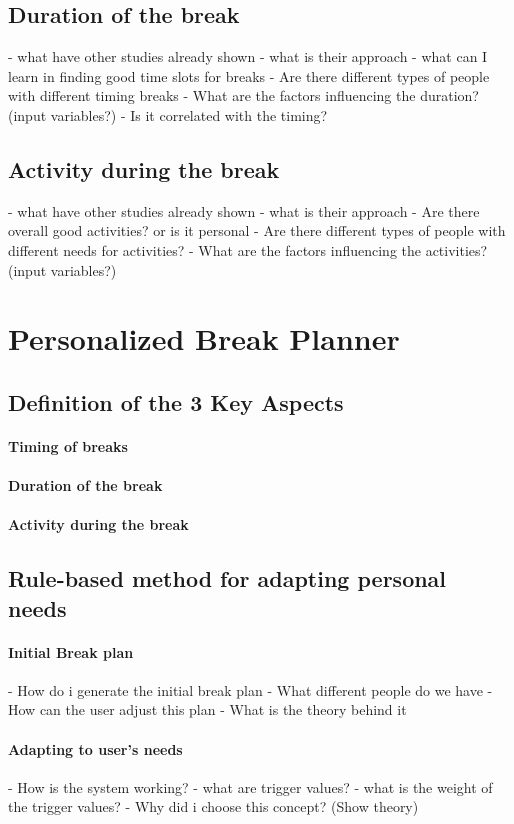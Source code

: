 \documentclass{hasel_thesis}
\begin{document}
\section{Duration of the break}
- what have other studies already shown
- what is their approach
- what can I learn in finding good time slots for breaks
- Are there different types of people with different timing breaks
- What are the factors influencing the duration? (input variables?)
- Is it correlated with the timing?

\section{Activity during the break}
- what have other studies already shown
- what is their approach
- Are there overall good activities? or is it personal
- Are there different types of people with different needs for activities?
- What are the factors influencing the activities? (input variables?)

\chapter{Personalized Break Planner}
\section{Definition of the 3 Key Aspects}
\subsubsection{Timing of breaks}
\subsubsection{Duration of the break}
\subsubsection{Activity during the break}
\section{Rule-based method for adapting personal needs}
\subsubsection{Initial Break plan}
- How do i generate the initial break plan
- What different people do we have
- How can the user adjust this plan
- What is the theory behind it
\subsubsection{Adapting to user's needs}
- How is the system working?
- what are trigger values?
- what is the weight of the trigger values?
- Why did i choose this concept? (Show theory)
\end{document}
